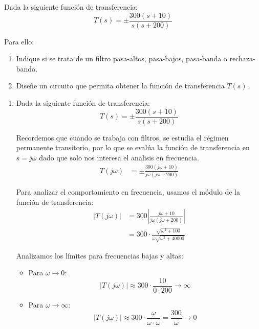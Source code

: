 \documentclass[
  11pt,
  letterpaper,
   addpoints,
   answers
  ]{exam}
\begin{document}
\begin{questions}
\begin{solution}
\end{solution}
\question Dada la siguiente función de transferencia:
\begin{equation}
    T(s) = \pm \frac{300(s + 10)}{s(s + 200)}
\end{equation}

Para ello:
\begin{enumerate}
    \item Indique si se trata de un filtro pasa-altos, pasa-bajos, pasa-banda o rechaza-banda.
    \item Diseñe un circuito que permita obtener la función de transferencia \(T(s)\).
\end{enumerate}
\begin{solution}
    \begin{enumerate}
        \item Dada la siguiente función de transferencia:
\begin{equation}
    T(s) = \pm \frac{300(s+10)}{s(s+200)}
\end{equation}

Recordemos que cuando se trabaja con filtros, se estudia el régimen permanente transitorio, por lo que se evalúa la función de transferencia en \( s = j\omega \) dado que solo nos interesa el analisis en frecuencia.
\begin{align}
    T(j\omega) &= \pm \frac{300(j\omega + 10)}{j\omega (j\omega + 200)}
\end{align}

Para analizar el comportamiento en frecuencia, usamos el módulo de la función de transferencia:
\begin{align}
    |T(j\omega)| &= 300 \left| \frac{j\omega + 10}{j\omega (j\omega + 200)} \right| \\
    &= 300 \cdot \frac{\sqrt{\omega^2 + 100}}{\omega \sqrt{\omega^2 + 40000}}
\end{align}

Analizamos los límites para frecuencias bajas y altas:

\begin{itemize}
    \item Para \(\omega \to 0\):
    \[
        |T(j\omega)| \approx 300 \cdot \frac{10}{0 \cdot 200} \to \infty
    \]
    \item Para \(\omega \to \infty\):
    \[
        |T(j\omega)| \approx 300 \cdot \frac{\omega}{\omega \cdot \omega} = \frac{300}{\omega} \to 0
    \]
\end{itemize}


\end{enumerate}
\end{solution}
\end{questions}
\end{document}
